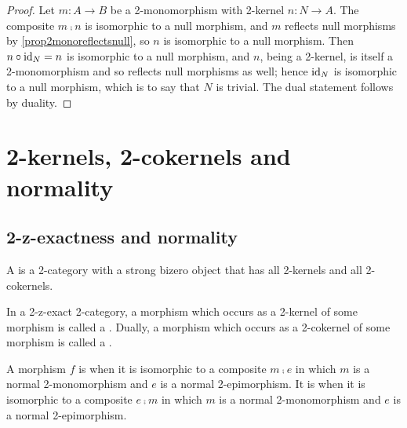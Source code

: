 \begin{proof}
  \leanok
  Let \(m\colon A\to B\) be a 2-monomorphism with 2-kernel \(n\colon N\to A\). The composite \(m\comp n\) is isomorphic to a null morphism, and \(m\) reflects null morphisms by \prox\ref{prop2monoreflectsnull}, so \(n\) is isomorphic to a null morphism. Then \(n\circ\operatorname{id}_{N}=n\) is isomorphic to a null morphism, and \(n\), being a 2-kernel, is itself a 2-monomorphism and so reflects null morphisms as well; hence \(\operatorname{id}_{N}\) is isomorphic to a null morphism, which is to say that \(N\) is trivial. The dual statement follows by duality.
\end{proof}

\section{2-kernels, 2-cokernels and normality}\label{S:Normality}

\subsection{2-z-exactness and normality}\label{SS:ZExact}

\begin{definition}
  \label{Def ZExact}  \leanok
  A  is a 2-category with a strong bizero object that has all 2-kernels and all 2-cokernels.
\end{definition}

\begin{definition}
  \label{Def Normal Mono}   \leanok
  In a 2-z-exact 2-category, a morphism which occurs as a 2-kernel of some morphism is called a . Dually, a morphism which occurs as a 2-cokernel of some morphism is called a .
\end{definition}

\begin{definition}
  \label{Def Normal}   \leanok
  A morphism \(f\) is  when it is isomorphic to a composite \(m\comp e\) in which \(m\) is a normal 2-monomorphism and \(e\) is a normal 2-epimorphism. It is  when it is isomorphic to a composite \(e\comp m\) in which \(m\) is a normal 2-monomorphism and \(e\) is a normal 2-epimorphism.
\end{definition}

